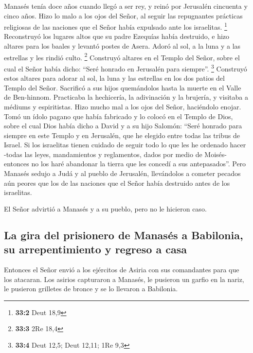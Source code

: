  Manasés tenía doce años cuando llegó a ser rey, y reinó
por Jerusalén cincuenta y cinco años.  Hizo lo malo a los
ojos del Señor, al seguir las repugnantes prácticas religiosas de las
naciones que el Señor había expulsado ante los israelitas. \footnote{\textbf{33:2}
  Deut 18,9}  Reconstruyó los lugares altos que su padre
Ezequías había destruido, e hizo altares para los baales y levantó
postes de Asera. Adoró al sol, a la luna y a las estrellas y les rindió
culto. \footnote{\textbf{33:3} 2Re 18,4}  Construyó
altares en el Templo del Señor, sobre el cual el Señor había dicho:
``Seré honrado en Jerusalén para siempre''. \footnote{\textbf{33:4} Deut
  12,5; Deut 12,11; 1Re 9,3}  Construyó estos altares para
adorar al sol, la luna y las estrellas en los dos patios del Templo del
Señor.  Sacrificó a sus hijos quemándolos hasta la muerte
en el Valle de Ben-hinnom. Practicaba la hechicería, la adivinación y la
brujería, y visitaba a médiums y espiritistas. Hizo mucho mal a los ojos
del Señor, haciéndolo enojar.  Tomó un ídolo pagano que
había fabricado y lo colocó en el Templo de Dios, sobre el cual Dios
había dicho a David y a su hijo Salomón: ``Seré honrado para siempre en
este Templo y en Jerusalén, que he elegido entre todas las tribus de
Israel.  Si los israelitas tienen cuidado de seguir todo
lo que les he ordenado hacer -todas las leyes, mandamientos y
reglamentos, dados por medio de Moisés- entonces no los haré abandonar
la tierra que les concedí a sus antepasados''.  Pero
Manasés sedujo a Judá y al pueblo de Jerusalén, llevándolos a cometer
pecados aún peores que los de las naciones que el Señor había destruido
antes de los israelitas.

 El Señor advirtió a Manasés y a su pueblo, pero no le
hicieron caso.

\hypertarget{la-gira-del-prisionero-de-manasuxe9s-a-babilonia-su-arrepentimiento-y-regreso-a-casa}{%
\subsection{La gira del prisionero de Manasés a Babilonia, su
arrepentimiento y regreso a
casa}\label{la-gira-del-prisionero-de-manasuxe9s-a-babilonia-su-arrepentimiento-y-regreso-a-casa}}

 Entonces el Señor envió a los ejércitos de Asiria con
sus comandantes para que los atacaran. Los asirios capturaron a Manasés,
le pusieron un garfio en la nariz, le pusieron grilletes de bronce y se
lo llevaron a Babilonia.

